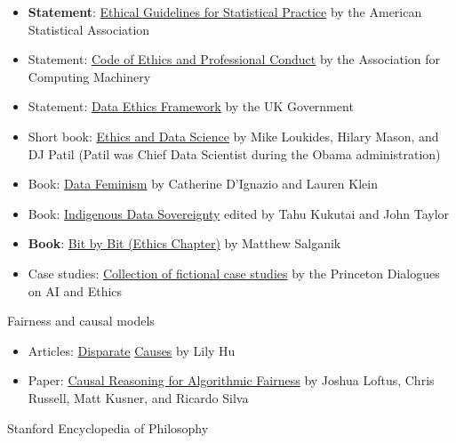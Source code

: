 \documentclass[]{book}
\providecommand{\tightlist}{%
  \setlength{\itemsep}{0pt}\setlength{\parskip}{0pt}}
\theoremstyle{definition}
\theoremstyle{definition}
\theoremstyle{definition}
\theoremstyle{remark}
\begin{document}
\begin{itemize}
\tightlist
\item
  \textbf{Statement}:
  \href{https://www.amstat.org/ASA/Your-Career/Ethical-Guidelines-for-Statistical-Practice.aspx}{Ethical
  Guidelines for Statistical Practice} by the American Statistical
  Association
\item
  Statement: \href{https://www.acm.org/code-of-ethics}{Code of Ethics
  and Professional Conduct} by the Association for Computing Machinery
\item
  Statement:
  \href{https://www.gov.uk/government/publications/data-ethics-framework/data-ethics-framework}{Data
  Ethics Framework} by the UK Government
\item
  Short book:
  \href{https://resources.oreilly.com/examples/0636920203964}{Ethics and
  Data Science} by Mike Loukides, Hilary Mason, and DJ Patil (Patil was
  Chief Data Scientist during the Obama administration)
\item
  Book: \href{https://bookbook.pubpub.org/data-feminism}{Data Feminism}
  by Catherine D'Ignazio and Lauren Klein
\item
  Book:
  \href{https://press.anu.edu.au/publications/series/caepr/indigenous-data-sovereignty}{Indigenous
  Data Sovereignty} edited by Tahu Kukutai and John Taylor
\item
  \textbf{Book}: \href{https://www.bitbybitbook.com/en/ethics/}{Bit by
  Bit (Ethics Chapter)} by Matthew Salganik
\item
  Case studies:
  \href{https://aiethics.princeton.edu/case-studies/case-study-pdfs/}{Collection
  of fictional case studies} by the Princeton Dialogues on AI and Ethics
\end{itemize}

Fairness and causal models

\begin{itemize}
\tightlist
\item
  Articles:
  \href{https://phenomenalworld.org/digital-ethics/disparate-causes-i}{Disparate}
  \href{https://phenomenalworld.org/digital-ethics/disparate-causes-pt-ii}{Causes}
  by Lily Hu
\item
  Paper: \href{https://arxiv.org/abs/1805.05859}{Causal Reasoning for
  Algorithmic Fairness} by Joshua Loftus, Chris Russell, Matt Kusner,
  and Ricardo Silva
\end{itemize}

Stanford Encyclopedia of Philosophy
\end{document}
